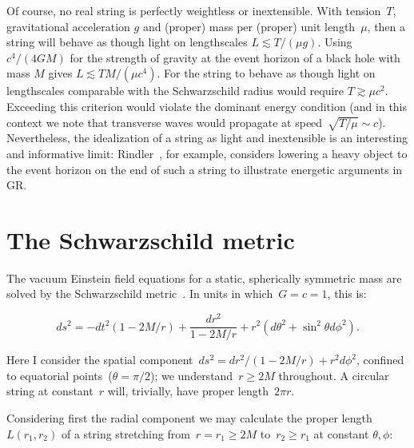 \documentclass[review]{elsarticle}
\begin{document}
Of course, no real string is perfectly weightless or inextensible.
With tension~$T$, gravitational acceleration $g$ and (proper) mass per
(proper) unit length~$\mu$, then a string will behave as though light
on lengthscales $L\lesssim T/\left(\mu g\right)$.  Using
$c^4/\left(4GM\right)$ for the strength of gravity at the event
horizon of a black hole with mass $M$ gives $L\lesssim TM/\left(\mu
c^4\right)$.  For the string to behave as though light on lengthscales
comparable with the Schwarzschild radius would require $T\gtrsim\mu
c^2$.  Exceeding this criterion would violate the dominant energy
condition (and in this context we note that transverse waves would
propagate at speed~$\sqrt{T/\mu}\sim c$).  Nevertheless, the
idealization of a string as light and inextensible is an interesting
and informative limit: Rindler~\cite{rindler}, for example, considers
lowering a heavy object to the event horizon on the end of such a
string to illustrate energetic arguments in GR.

\section{The Schwarzschild metric}

The vacuum Einstein field equations for a static, spherically
symmetric mass are solved by the Schwarzschild
metric~\cite{schwarzschild1916}.  In units in which~$G=c=1$, this is:

\begin{equation}\label{schwarzschild}
ds^2= -dt^2\left(1-2M/r\right) +\frac{dr^2}{1-2M/r} + r^2\left(d\theta^2 + \sin^2\theta d\phi^2\right).
\end{equation}

\noindent Here I consider the spatial component~$ds^2=
dr^2/\left(1-2M/r\right) + r^2d\phi^2$, confined to equatorial
points~($\theta=\pi/2$); we understand~$r\geqslant 2M$ throughout.  A
circular string at constant~$r$ will, trivially, have proper
length~$2\pi r$.

Considering first the radial component we may calculate the
proper length $L\left(r_1,r_2\right)$ of a string stretching
from~$r=r_1\geqslant 2M$ to~$r_2\geqslant r_1$ at constant $\theta,\phi$:


\end{document}
